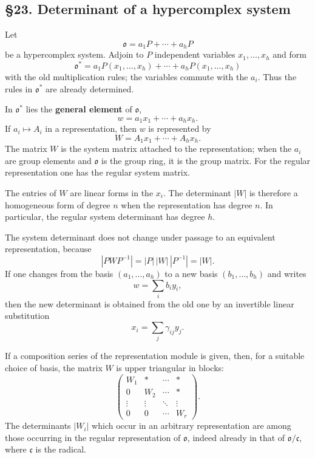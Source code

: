 \documentclass[11pt]{article}
\begin{document}
\subsection{§23. Determinant of a hypercomplex
system}\label{determinant-of-a-hypercomplex-system}

Let \[
  \mathfrak{o}=a_1P+
\cdots+a_hP
\] be a hypercomplex system. Adjoin to \(P\) independent variables
\(x_1,\ldots,x_h\) and form \[
  \mathfrak{o}^*=a_1P(x_1,\ldots,x_h)+\cdots+a_hP(x_1,\ldots,x_h)
\] with the old multiplication rules; the variables commute with the
\(a_i\). Thus the rules in \(\mathfrak{o}^*\) are already determined.

In \(\mathfrak{o}^*\) lies the \textbf{general element} of
\(\mathfrak{o}\), \[
  w=a_1x_1+
\cdots+a_hx_h.
\] If \(a_i\mapsto A_i\) in a representation, then \(w\) is represented
by \[
  W=A_1x_1+\cdots+A_hx_h.
\] The matrix \(W\) is the system matrix attached to the representation;
when the \(a_i\) are group elements and \(\mathfrak{o}\) is the group
ring, it is the group matrix. For the regular representation one has the
regular system matrix.

The entries of \(W\) are linear forms in the \(x_i\). The determinant
\(|W|\) is therefore a homogeneous form of degree \(n\) when the
representation has degree \(n\). In particular, the regular system
determinant has degree \(h\).

The system determinant does not change under passage to an equivalent
representation, because \[
  |PWP^{-1}|=|P|\,|W|\,|P^{-1}|=|W|.
\] If one changes from the basis \((a_1,\ldots,a_h)\) to a new basis
\((b_1,\ldots,b_h)\) and writes \[
  w=\sum_i b_i y_i,
\] then the new determinant is obtained from the old one by an
invertible linear substitution \[
  x_i=\sum_j \gamma_{ij}y_j.
\]

If a composition series of the representation module is given, then, for
a suitable choice of basis, the matrix \(W\) is upper triangular in
blocks: \[
\begin{pmatrix}
W_1&*&\cdots&*\\
0&W_2&\cdots&*\\
\vdots&\vdots&\ddots&\vdots\\
0&0&\cdots&W_r
\end{pmatrix}.
\] The determinants \(|W_i|\) which occur in an arbitrary representation
are among those occurring in the regular representation of
\(\mathfrak{o}\), indeed already in that of
\(\mathfrak{o}/\mathfrak c\), where \(\mathfrak c\) is the radical.
\end{document}
